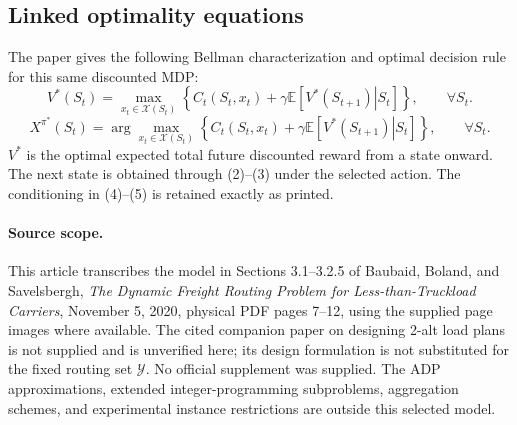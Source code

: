 \documentclass{article}
\begin{document}
\subsection*{Linked optimality equations}
The paper gives the following Bellman characterization and optimal decision rule for this same discounted MDP:
\begin{equation}
V^*(S_t)=\max_{x_t\in\mathcal{X}(S_t)}
\left\{C_t(S_t,x_t)+\gamma\mathbb{E}\left[
\left.V^*(S_{t+1})\right|S_t\right]\right\},
\qquad\forall S_t.
\tag{4}
\end{equation}
\begin{equation}
X^{\pi^*}(S_t)=\arg\max_{x_t\in\mathcal{X}(S_t)}
\left\{C_t(S_t,x_t)+\gamma\mathbb{E}\left[
\left.V^*(S_{t+1})\right|S_t\right]\right\},
\qquad\forall S_t.
\tag{5}
\end{equation}
$V^*$ is the optimal expected total future discounted reward from a state onward. The next state is obtained through (2)--(3) under the selected action. The conditioning in (4)--(5) is retained exactly as printed.

\paragraph{Source scope.}
This article transcribes the model in Sections 3.1--3.2.5 of Baubaid, Boland, and Savelsbergh, \emph{The Dynamic Freight Routing Problem for Less-than-Truckload Carriers}, November 5, 2020, physical PDF pages 7--12, using the supplied page images where available. The cited companion paper on designing 2-alt load plans is not supplied and is unverified here; its design formulation is not substituted for the fixed routing set $\mathcal{Y}$. No official supplement was supplied. The ADP approximations, extended integer-programming subproblems, aggregation schemes, and experimental instance restrictions are outside this selected model.
\end{document}
